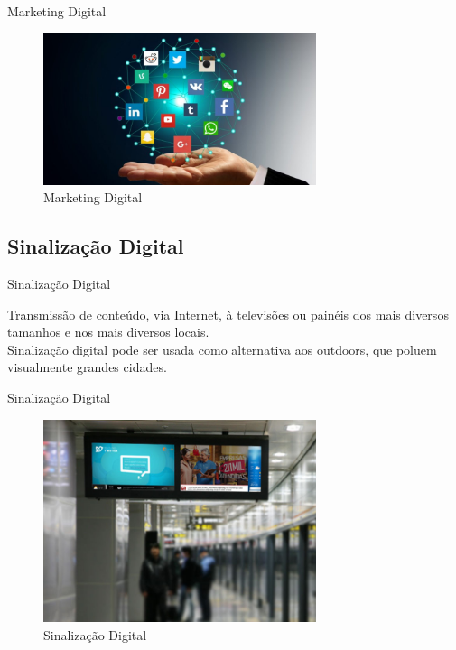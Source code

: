 \documentclass{aula-ifb}
\begin{document}
\begin{frame}{Marketing Digital}
\begin{figure}[h]
\includegraphics[width=8cm]{figuras/marketingdigital.png}
\caption{Marketing Digital \cite{figura1}}
\label{fig:siteifb}
\end{figure}
\end{frame}

\subsection{Sinalização Digital}
\begin{frame}{Sinalização Digital}
\begin{center}
Transmissão de conteúdo, via Internet, à televisões ou painéis dos mais diversos tamanhos e nos mais diversos locais. \cite{machado2010}\\

\vspace{20px}
Sinalização digital pode ser usada como alternativa aos outdoors, que poluem visualmente grandes cidades. \cite{cintra2010}

\end{center}
\end{frame}

\begin{frame}{Sinalização Digital}
\begin{figure}[h]
\includegraphics[width=8cm]{figuras/sinalizacaodigital.png}
\caption{Sinalização Digital \cite{figura2}}
\label{fig:siteifb}
\end{figure}
\end{frame}
\end{document}
